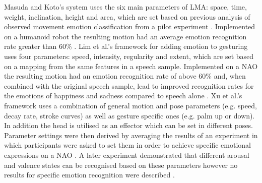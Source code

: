 \documentclass[11pt]{article}
\begin{document}
Masuda and Koto's system uses the six main parameters of LMA: space, time, weight, inclination, height and area, which are set based on previous analysis of observed movement emotion classification from a pilot experiment \cite{masuda2009emotion}. Implemented on a humanoid robot the resulting motion had an average emotion recognition rate greater than 60\% \cite{masuda2010motion}. Lim et al.'s framework for adding emotion to gesturing uses four parameters: speed, intensity, regularity and extent, which are set based on a mapping from the same features in a speech sample. Implemented on a NAO the resulting motion had an emotion recognition rate of above 60\% and, when combined with the original speech sample, lead to improved recognition rates for the emotions of happiness and sadness compared to speech alone \cite{lim2011converting}. Xu et al.'s framework uses a combination of general motion and pose parameters (e.g. speed, decay rate, stroke curves) as well as gesture specific ones (e.g. palm up or down). In addition the head is utilised as an effector which can be set in different poses. Parameter settings were then derived by averaging the results of an experiment in which participants were asked to set them in order to achieve specific emotional expressions on a NAO \cite{xu2013mood}. A later experiment demonstrated that different arousal and valence states can be recognised based on these parameters however no results for specific emotion recognition were described \cite{xu2013bodily}.

\end{document}
